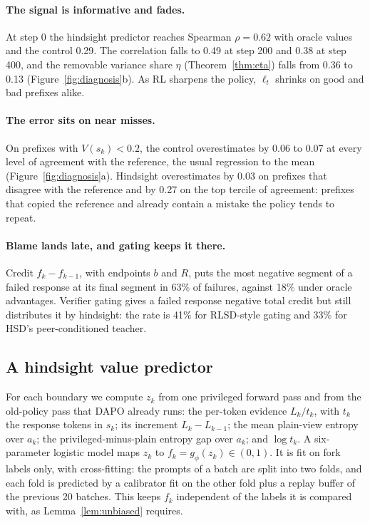 \documentclass[11pt]{article}
\theoremstyle{remark}
\begin{document}
\paragraph{The signal is informative and fades.}
At step 0 the hindsight predictor reaches Spearman $\rho=0.62$ with oracle values and the control 0.29. The correlation falls to 0.49 at step 200 and 0.38 at step 400, and the removable variance share $\eta$ (Theorem~\ref{thm:eta}) falls from 0.36 to 0.13 (Figure~\ref{fig:diagnosis}b). As RL sharpens the policy, $\ell_t$ shrinks on good and bad prefixes alike.

\paragraph{The error sits on near misses.}
On prefixes with $V(s_k)<0.2$, the control overestimates by 0.06 to 0.07 at every level of agreement with the reference, the usual regression to the mean (Figure~\ref{fig:diagnosis}a). Hindsight overestimates by 0.03 on prefixes that disagree with the reference and by 0.27 on the top tercile of agreement: prefixes that copied the reference and already contain a mistake the policy tends to repeat.

\paragraph{Blame lands late, and gating keeps it there.}
Credit $f_k-f_{k-1}$, with endpoints $b$ and $R$, puts the most negative segment of a failed response at its final segment in 63\% of failures, against 18\% under oracle advantages. Verifier gating gives a failed response negative total credit but still distributes it by hindsight: the rate is 41\% for RLSD-style gating and 33\% for HSD's peer-conditioned teacher.

\subsection{A hindsight value predictor}
\label{sec:predictor}

For each boundary we compute $z_k$ from one privileged forward pass and from the old-policy pass that DAPO already runs: the per-token evidence $L_k/t_k$, with $t_k$ the response tokens in $s_k$; its increment $L_k-L_{k-1}$; the mean plain-view entropy over $a_k$; the privileged-minus-plain entropy gap over $a_k$; and $\log t_k$. A six-parameter logistic model maps $z_k$ to $f_k=g_\phi(z_k)\in(0,1)$. It is fit on fork labels only, with cross-fitting: the prompts of a batch are split into two folds, and each fold is predicted by a calibrator fit on the other fold plus a replay buffer of the previous 20 batches. This keeps $f_k$ independent of the labels it is compared with, as Lemma~\ref{lem:unbiased} requires.
\end{document}
